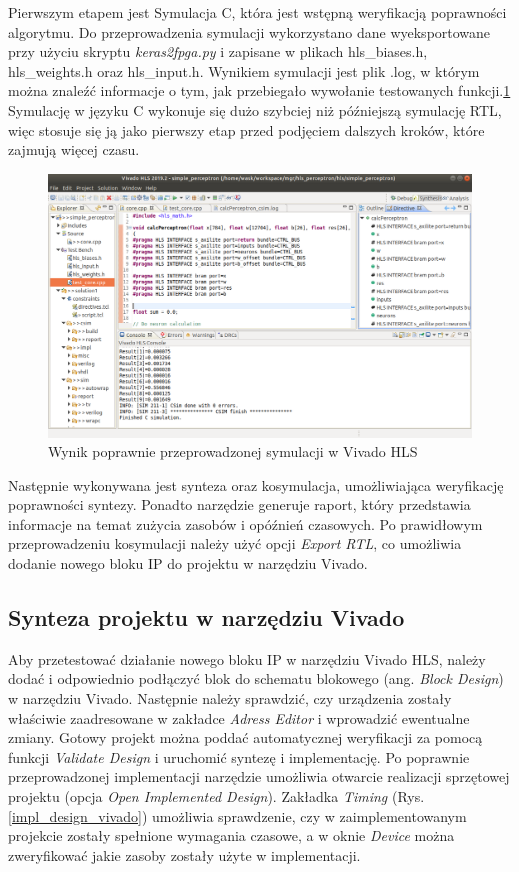 Pierwszym etapem jest Symulacja C, która jest wstępną weryfikacją poprawności
algorytmu. Do przeprowadzenia symulacji wykorzystano dane wyeksportowane przy użyciu 
skryptu \emph{keras2fpga.py} i zapisane w plikach hls\_biases.h, hls\_weights.h oraz 
hls\_input.h. Wynikiem symulacji jest plik .log, w którym można znaleźć informacje o
tym, jak przebiegało wywołanie testowanych funkcji.\ref{hls_design_sim}
Symulację w języku C wykonuje się dużo szybciej niż późniejszą symulację RTL, więc
stosuje się ją jako pierwszy etap przed podjęciem dalszych kroków, które zajmują 
więcej czasu.

\begin{figure}[!h]
  \centering
  \includegraphics[width=\textwidth]{img/vivado_hls_sim.png}
  \caption{Wynik poprawnie przeprowadzonej symulacji w Vivado HLS}
  \label{hls_design_sim}
\end{figure}


Następnie wykonywana jest synteza oraz kosymulacja, umożliwiająca 
weryfikację poprawności syntezy. Ponadto narzędzie generuje raport, który przedstawia
informacje na temat zużycia zasobów i opóźnień czasowych. Po prawidłowym 
przeprowadzeniu kosymulacji należy użyć opcji \emph{Export RTL}, co umożliwia 
dodanie nowego bloku IP do projektu w narzędziu Vivado.

\subsection{Synteza projektu w narzędziu Vivado}

Aby przetestować działanie nowego bloku IP w narzędziu Vivado HLS, należy dodać i odpowiednio podłączyć blok do 
schematu blokowego (ang. \emph{Block Design}) w narzędziu Vivado. Następnie należy sprawdzić, czy urządzenia zostały 
właściwie zaadresowane w zakładce \emph{Adress Editor} i wprowadzić ewentualne zmiany. Gotowy projekt można poddać 
automatycznej weryfikacji za pomocą funkcji \emph{Validate Design} i uruchomić syntezę i implementację. Po poprawnie 
przeprowadzonej implementacji narzędzie umożliwia otwarcie realizacji sprzętowej projektu (opcja \emph{Open Implemented 
Design}). Zakładka \emph{Timing} (Rys. \ref{impl_design_vivado}) umożliwia sprawdzenie, czy w zaimplementowanym 
projekcie zostały spełnione wymagania czasowe, a w oknie \emph{Device} można zweryfikować jakie zasoby zostały użyte w 
implementacji.

